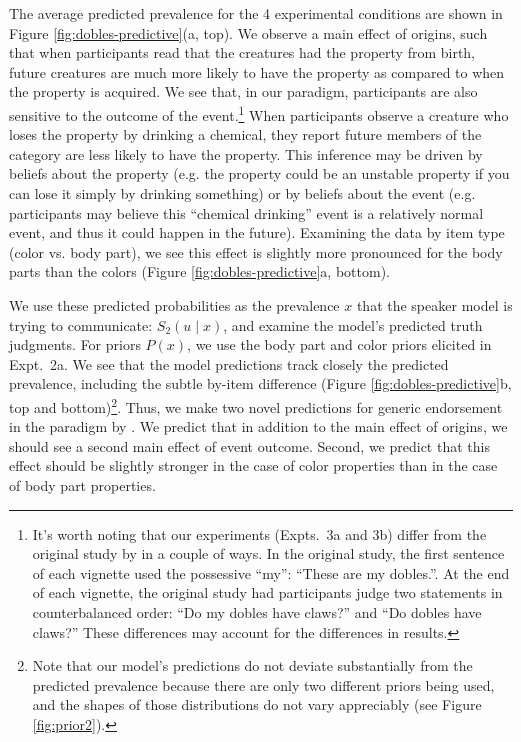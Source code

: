 \documentclass[12pt,letterpaper]{article}
\begin{document}
The average predicted prevalence for the 4 experimental conditions are shown in Figure \ref{fig:dobles-predictive}(a, top).
We observe a main effect of origins, such that when participants read that the creatures had the property from birth, future creatures  are much more likely to have the property as compared to when the property is acquired.
We see that, in our paradigm, participants are also sensitive to the outcome of the event.\footnote{
It's worth noting that our experiments (Expts.~3a and 3b) differ from the original study by \citeauthor{Gelman2007} in a couple of ways.
In the original study, the first sentence of each vignette used the possessive ``my'': ``These are my dobles.''.
At the end of each vignette, the original study had participants judge two statements in counterbalanced order: ``Do my dobles have claws?'' and ``Do dobles have claws?''
These differences may account for the differences in results.
}
When participants observe a creature who loses the property by drinking a chemical, they report future members of the category are less likely to have the property.
This inference may be driven by beliefs about the property (e.g. the property could be an unstable property if you can lose it simply by drinking something) or by beliefs about the event (e.g. participants may believe this ``chemical drinking'' event is a relatively normal event, and thus it could happen in the future).
Examining the data by item type (color vs. body part), we see this effect is slightly more pronounced for the body parts than the colors (Figure \ref{fig:dobles-predictive}a, bottom). 

We use these predicted probabilities as the prevalence $x$ that the speaker model is trying to communicate: $S_2(u\mid x)$, and examine the model's predicted truth judgments.
For priors $P(x)$, we use the body part and color priors elicited in Expt.~2a.
We see that the model predictions track closely the predicted prevalence, including the subtle by-item difference (Figure \ref{fig:dobles-predictive}b, top and bottom)\footnote{Note that our model's predictions do not deviate substantially from the predicted prevalence because there are only two different priors being used, and the shapes of those distributions do not vary appreciably (see Figure \ref{fig:prior2}).
}.
Thus, we make two novel predictions for generic endorsement in the paradigm by .
We predict that in addition to the main effect of origins, we should see a second main effect of event outcome.
Second, we predict that this effect should be slightly stronger in the case of color properties than in the case of body part properties.
\end{document}
